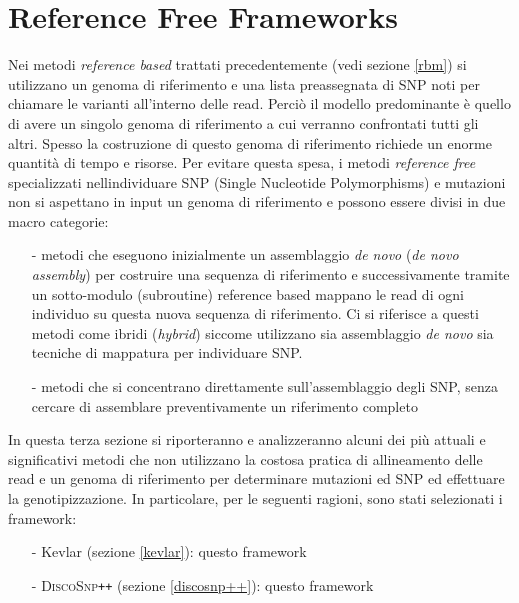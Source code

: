 \documentclass[../main.tex]{subfiles}
\begin{document}
\section{Reference Free Frameworks}
\label{rfm}

Nei metodi \textit{reference based} trattati precedentemente (vedi sezione \ref{rbm}) si utilizzano un genoma di riferimento e una lista preassegnata di SNP noti per chiamare le varianti all'interno delle read. Perci\`o il modello predominante \`e quello di avere un singolo genoma di riferimento a cui verranno confrontati tutti gli altri. Spesso la costruzione di questo genoma di riferimento richiede un enorme quantit\`a di tempo e risorse. Per evitare questa spesa, i metodi \textit{reference free} specializzati nell\textquotesingle individuare SNP (Single Nucleotide Polymorphisms) e mutazioni non si aspettano in input un genoma di riferimento e possono essere divisi in due macro categorie:

\begin{itemize} 
\item[-] metodi che eseguono inizialmente un assemblaggio \textit{de novo} (\textit{de novo assembly}) per costruire una sequenza di riferimento e successivamente tramite un sotto-modulo (subroutine) reference based mappano le read di ogni individuo su questa nuova sequenza di riferimento. Ci si riferisce a questi metodi come ibridi (\textit{hybrid}) siccome utilizzano sia assemblaggio \textit{de novo} sia tecniche di mappatura per individuare SNP.
\item[-] metodi che si concentrano direttamente sull’assemblaggio degli SNP, senza cercare di assemblare preventivamente un riferimento completo
\end{itemize}

In questa terza sezione si riporteranno e analizzeranno alcuni dei pi\`u attuali e significativi metodi che non utilizzano la costosa pratica di allineamento delle read e un genoma di riferimento per determinare mutazioni ed SNP ed effettuare la genotipizzazione. In particolare, per le seguenti ragioni, sono stati selezionati i framework:
\begin{itemize} 
\item[-] Kevlar (sezione \ref{kevlar}): questo framework \cite{}
\item[-] \textsc{DiscoSnp}\texttt{++} (sezione \ref{discosnp++}): questo framework \cite{} 
\end{itemize}
\end{document}
